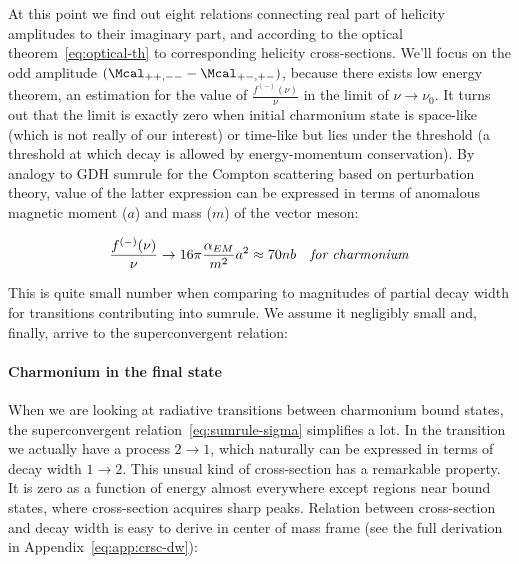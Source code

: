 At this point we find out eight relations connecting real part of helicity amplitudes to their imaginary part, and according to the optical theorem~\cref{eq:optical-th} to corresponding helicity cross-sections. We'll focus on the odd amplitude $(\Mcal_{++,--} - \Mcal_{+-,+-})$, because there exists low energy theorem, an estimation for the value of $\frac{f^{(-)}(\nu)}{\nu}$ in the limit of $\nu \rightarrow \nu_0$. It turns out that the limit is exactly zero when initial charmonium state is space-like (which is not really of our interest) or time-like but lies under the threshold (a threshold at which decay is allowed by energy-momentum conservation). By analogy to GDH sumrule for the Compton scattering based on perturbation theory, value of the latter expression can be expressed in terms of anomalous magnetic moment ($a$) and mass ($m$) of the vector meson:

\begin{align}
    \frac{f^{(-)}(\nu)}{\nu} \rightarrow 16 \pi \frac{\alpha_{EM}}{m^2} a^2 \approx 70 nb \text{\quad \textit{for charmonium}}
\end{align}

This is quite small number when comparing to magnitudes of partial decay width for transitions contributing into sumrule. We assume it negligibly small and, finally, arrive to the superconvergent relation:

\begin{center}  \end{center}

\paragraph{Charmonium in the final state}
When we are looking at radiative transitions between charmonium bound states, the superconvergent relation~\cref{eq:sumrule-sigma} simplifies a lot. In the transition we actually have a process $2 \rightarrow 1$, which naturally can be expressed in terms of decay width $1 \rightarrow 2$. This unsual kind of cross-section has a remarkable property. It is zero as a function of energy almost everywhere except regions near bound states, where cross-section acquires sharp peaks. Relation between cross-section and decay width is easy to derive in center of mass frame (see the full derivation in Appendix~\cref{eq:app:crsc-dw}):

